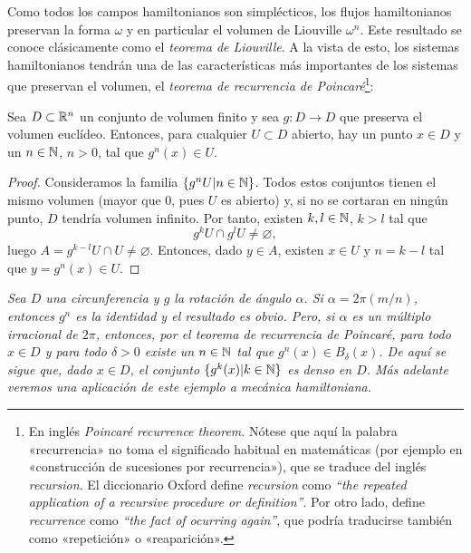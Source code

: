   Como todos los campos hamiltonianos son simplécticos, los flujos hamiltonianos preservan la forma $\omega$ y en particular el volumen de Liouville $\omega^n$. Este resultado se conoce clásicamente como el \emph{teorema de Liouville}. A la vista de esto, los sistemas hamiltonianos tendrán una de las características más importantes de los sistemas que preservan el volumen, el \emph{teorema de recurrencia de Poincaré}\footnote{En inglés \textit{Poincaré recurrence theorem}. Nótese que aquí la palabra «recurrencia» no toma el significado habitual en matemáticas (por ejemplo en «construcción de sucesiones por recurrencia»), que se traduce del inglés \textit{recursion}. El diccionario Oxford define \textit{recursion} como \textit{``the repeated application of a recursive procedure or definition''}. Por otro lado, define \textit{recurrence} como \textit{``the fact of ocurring again''}, que podría traducirse también como «repetición» o «reaparición».}:
  \begin{prop}\label{tpoincare}
 Sea $D\subset \mathbb{R}^n$ un conjunto de volumen finito y sea $g:D\rightarrow D$ que preserva el volumen euclídeo. Entonces, para cualquier $U\subset D$ abierto, hay un punto $x\in D$ y un $n\in \mathbb{N}$, $n>0$, tal que $g^n(x) \in U$.
\end{prop}
\begin{proof}
  Consideramos la familia
    $\{g^nU | n \in \mathbb{N} \}$.
  Todos estos conjuntos tienen el mismo volumen (mayor que 0, pues $U$ es abierto) y, si no se cortaran en ningún punto, $D$ tendría volumen infinito. Por tanto, existen $k,l\in \mathbb{N}$, $k>l$ tal que
  \begin{equation*}
    g^kU\cap g^lU \neq \varnothing,
  \end{equation*}
  luego $A=g^{k-l}U \cap U \neq \varnothing$. Entonces, dado $y\in A$, existen $x \in U$ y $n=k-l$ tal que $y=g^n(x)\in U$.
\end{proof}
\begin{ejemplo}
  \em
  Sea $D$ una circunferencia y $g$ la rotación de ángulo $\alpha$. Si $\alpha=2\pi(m/n)$, entonces $g^n$ es la identidad y el resultado es obvio. Pero, si $\alpha$ es un múltiplo irracional de $2\pi$, entonces, por el teorema de recurrencia de Poincaré, para todo $x\in D$ y para todo $\delta>0$ existe un $n\in \mathbb{N}$ tal que $g^n(x) \in B_{\delta}(x)$.
  De aquí se sigue que, dado $x \in D$, el conjunto $\{g^k(x)|k\in \mathbb{N}\}$ es denso en $D$. Más adelante veremos una aplicación de este ejemplo a mecánica hamiltoniana.
\end{ejemplo}

